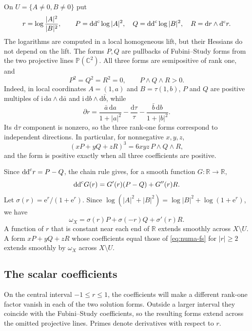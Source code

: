 On $U=\{A\ne0,B\ne0\}$ put
\[
 r=\log\frac{|A|^2}{|B|^2},\qquad
 P=\mathrm{dd}^{\mathrm{c}}\log|A|^2,\quad Q=\mathrm{dd}^{\mathrm{c}}\log|B|^2,\quad
 R=\mathrm{d}r\wedge \mathrm d^{\mathrm c} r.
\]
The logarithms are computed in a local homogeneous lift, but their Hessians do not depend on the lift. The forms $P,Q$ are pullbacks of Fubini--Study forms from the two projective lines $\mathbb P(\mathbb C^2)$. All three forms are semipositive of rank one, and
\begin{equation}\label{eq:numa-rank-frame}
 P^2=Q^2=R^2=0,\qquad P\wedge Q\wedge R>0.
\end{equation}
Indeed, in local coordinates $A=(1,a)$ and $B=\tau(1,b)$, $P$ and $Q$ are positive multiples of $\mathrm{i}\,\mathrm{d}a\wedge \mathrm{d}\bar a$ and $\mathrm{i}\,\mathrm{d}b\wedge \mathrm{d}\bar b$, while
\[
 \partial r=\frac{\bar a\,\mathrm{d}a}{1+|a|^2}
             -\frac{\mathrm{d}\tau}{\tau}
             -\frac{\bar b\,\mathrm{d}b}{1+|b|^2}.
\]
Its $\mathrm{d}\tau$ component is nonzero, so the three rank-one forms correspond to independent directions. In particular, for nonnegative $x,y,z$,
\begin{equation}\label{eq:numa-cube}
 (xP+yQ+zR)^3=6xyz\,P\wedge Q\wedge R,
\end{equation}
and the form is positive exactly when all three coefficients are positive.

Since $\mathrm{dd}^{\mathrm{c}} r=P-Q$, the chain rule gives, for a smooth function $G\colon\mathbb R\to\mathbb R$,
\begin{equation}\label{eq:numa-chain}
 \mathrm{dd}^{\mathrm{c}} G(r)=G'(r)(P-Q)+G''(r)R.
\end{equation}
Let $\sigma(r)=\mathrm{e}^r/(1+\mathrm{e}^r)$. Since
$\log(|A|^2+|B|^2)=\log|B|^2+\log(1+\mathrm{e}^r)$, we have
\begin{equation}\label{eq:numa-fs}
 \omega_X=\sigma(r)P+\sigma(-r)Q+\sigma'(r)R.
\end{equation}
A function of $r$ that is constant near each end of $\mathbb R$ extends smoothly across $X\setminus U$. A form $xP+yQ+zR$ whose coefficients equal those of \eqref{eq:numa-fs} for $|r|\geq2$ extends smoothly by $\omega_X$ across $X\setminus U$.

\subsection{The scalar coefficients}
\label{subsec:numa-scalar-coefficients}

On the central interval $-1\leq r\leq1$, the coefficients will make a different rank-one factor vanish in each of the two solution forms. Outside a larger interval they coincide with the Fubini--Study coefficients, so the resulting forms extend across the omitted projective lines. Primes denote derivatives with respect to $r$.

